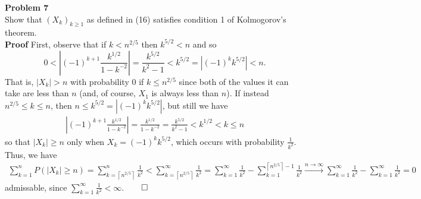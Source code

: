 \documentclass[10pt]{article}
\newcommand{\1}[1]{\mathbbm{1}_{#1}}
\newcommand*{\ceil}[1]{\left\lceil#1\right\rceil}
\begin{document}
    {\bf Problem 7}\\[5pt]
    Show that $(X_k)_{k\geq 1}$ as defined in (16) satisfies condition 1 of Kolmogorov's theorem.\\[5pt]
    {\bf Proof}\hspace{5pt} First, observe that if $k<n^{2/5}$ then $k^{5/2}<n$ and so
    \[0<\left|(-1)^{k+1}\frac{k^{1/2}}{1-k^{-2}}\right|=\frac{k^{5/2}}{k^2-1}<k^{5/2}=\left|(-1)^kk^{5/2}\right|<n.\tag{17}\]
    That is, $|X_k|>n$ with probability $0$ if $k\leq n^{2/5}$ since both of the values it can take are less than $n$ (and, of course, $X_1$ is always less than $n$). If instead $n^{2/5}\leq k\leq n$, then $n\leq k^{5/2}=|(-1)^kk^{5/2}|$, but still we have
    \begin{align*}
        \left|(-1)^{k+1}\frac{k^{1/2}}{1-k^{-2}}\right|=\frac{k^{1/2}}{1-k^{-2}}=\frac{k^{5/2}}{k^2-1}< k^{1/2}<k\leq n\tag{18}
    \end{align*}
    so that $|X_k|\geq n$ only when $X_k=(-1)^kk^{5/2}$, which occurs with probability $\tfrac{1}{k^2}$. Thus, we have
    \begin{align*}
        \sum_{k=1}^nP(|X_k|\geq n)=\sum_{k=\ceil{n^{2/5}}}^n\frac{1}{k^2}<\sum_{k=\ceil{n^{2/5}}}^\infty\frac{1}{k^2}=\sum_{k=1}^\infty\frac{1}{k^2}-\sum_{k=1}^{\ceil{n^{2/5}}-1}\frac{1}{k^2}\overset{n\rightarrow\infty}{\longrightarrow}\sum_{k=1}^\infty\frac{1}{k^2}-\sum_{k=1}^\infty\frac{1}{k^2}=0
    \end{align*}
    admissable, since $\sum_{k=1}^\infty\tfrac{1}{k^2}<\infty$.\hfill{$\qed$}\\[5pt]
\end{document}
